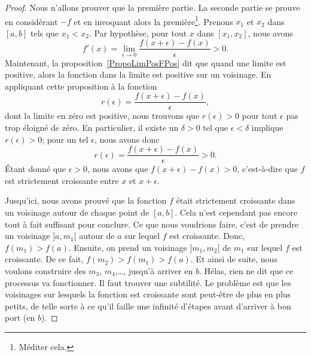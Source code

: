 \begin{proof}
	Nous n'allons prouver que la première partie. La seconde partie se prouve en considérant \( -f\) et en invoquant alors la première\footnote{Méditer cela.}. Prenons \( x_1\) et \( x_2\) dans \( [a,b]\) tels que \( x_1<x_2\). Par hypothèse, pour tout \( x\) dans \( [x_1,x_2]\), nous avons
	\begin{equation}
		f'(x)=\lim_{\epsilon\to 0}\frac{ f(x+\epsilon)-f(x) }{\epsilon} >0.
	\end{equation}
	Maintenant, la proposition~\ref{PropoLimPosFPos} dit que quand une limite est positive, alors la fonction dans la limite est positive sur un voisinage. En appliquant cette proposition à la fonction
	\begin{equation}
		r(\epsilon)=\frac{ f(x+\epsilon)-f(x) }{ \epsilon },
	\end{equation}
	dont la limite en zéro est positive, nous trouvons que \( r(\epsilon)>0\) pour tout \( \epsilon\) pas trop éloigné de zéro. En particulier, il existe un \( \delta>0\) tel que \( \epsilon<\delta\) implique \( r(\epsilon)>0\); pour un tel \( \epsilon\), nous avons donc
	\begin{equation}
		r(\epsilon)=\frac{ f(x+\epsilon)-f(x) }{ \epsilon }>0.
	\end{equation}
	Étant donné que \( \epsilon>0\), nous avons que \( f(x+\epsilon)-f(x)>0\), c'est-à-dire que \( f\) est strictement croissante entre \( x\) et \( x+\epsilon\).

	Jusqu'ici, nous avons prouvé que la fonction \( f\) était strictement croissante dans un voisinage autour de chaque point de \( [a,b]\). Cela n'est cependant pas encore tout à fait suffisant pour conclure. Ce que nous voudrions faire, c'est de prendre un voisinage \( ]a,m_1[\) autour de \( a\) sur lequel \( f\) est croissante. Donc, \( f(m_1)>f(a)\). Ensuite, on prend un voisinage \( ]m_1,m_2[\) de \( m_1\) sur lequel \( f\) est croissante. De ce fait, \( f(m_2)>f(m_1)>f(a)\). Et ainsi de suite, nous voulons construire des \( m_3\), \( m_4\),\ldots, jusqu'à arriver en \( b\). Hélas, rien ne dit que ce processus va fonctionner. Il faut trouver une subtilité. Le problème est que les voisinages sur lesquels la fonction est croissante sont peut-être de plus en plus petits, de telle sorte à ce qu'il faille une infinité d'étapes avant d'arriver à bon port (en \( b\)).


\end{proof}
